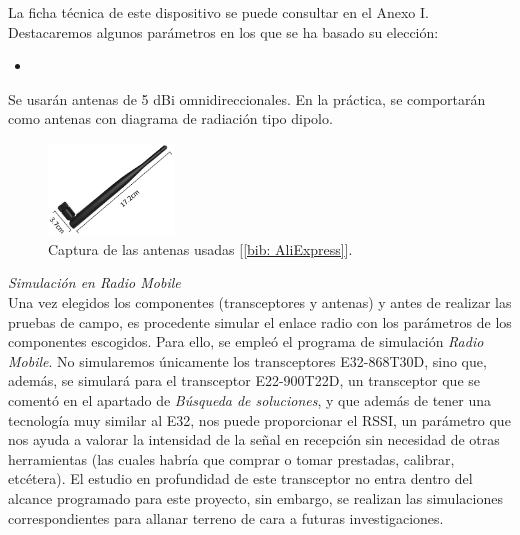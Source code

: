 \documentclass[12pt]{article}
\begin{document}
	\noindent La ficha técnica de este dispositivo se puede consultar en el Anexo I. Destacaremos algunos parámetros en los que se ha basado su elección: \\
	
	\begin{itemize}
		\item 
	\end{itemize}
	
	\noindent Se usarán antenas de 5 dBi omnidireccionales. En la práctica, se comportarán como antenas con diagrama de radiación tipo dipolo.\\
	
	\begin{figure}[h]
		\begin{center}
			\includegraphics[width=0.3\textwidth]{img/antena_5dbi.png}
			\caption{Captura de las antenas usadas [\ref{bib: AliExpress}].}
			\label{Captura antenas 5dbi}
		\end{center}
	\end{figure}
	
	\noindent \textit{Simulación en Radio Mobile}\\
	
	\noindent Una vez elegidos los componentes (transceptores y antenas) y antes de realizar las pruebas de campo, es procedente simular el enlace radio con los parámetros de los componentes escogidos. Para ello, se empleó el programa de simulación \textit{Radio Mobile}. No simularemos únicamente los transceptores E32-868T30D, sino que, además, se simulará para el transceptor E22-900T22D, un transceptor que se comentó en el apartado de \textit{Búsqueda de soluciones}, y que además de tener una tecnología muy similar al E32, nos puede proporcionar el RSSI, un parámetro que nos ayuda a valorar la intensidad de la señal en recepción sin necesidad de otras herramientas (las cuales habría que comprar o tomar prestadas, calibrar, etcétera). El estudio en profundidad de este transceptor no entra dentro del alcance programado para este proyecto, sin embargo, se realizan las simulaciones correspondientes para allanar terreno de cara a futuras investigaciones.\\
	
\end{document}
